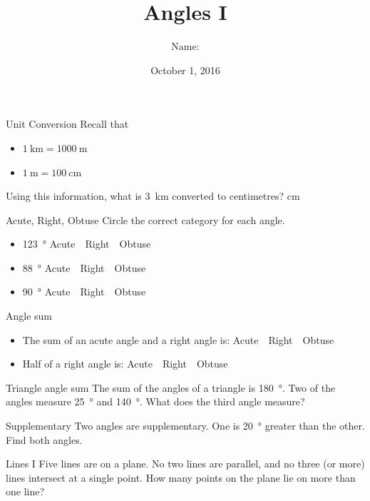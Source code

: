 \documentclass[14pt,letterpaper]{article}
\title{Angles I}
\author{Name: \underline{\hspace{5cm}}}
\date{October 1, 2016}
\begin{document}
\HomeworkTitle

\thispagestyle{empty}

\begin{problem}{Unit Conversion}
  Recall that \begin{itemize}
    \item $\SI{1}{\kilo\metre}=\SI{1000}{\metre}$
    \item $\SI{1}{\metre}=\SI{100}{\centi\metre}$
  \end{itemize}
  Using this information, what is \SI{3}{\kilo\metre} converted to centimetres?
  \hfill \blankE \si{\centi\metre}
\end{problem}

\begin{problem}{Acute, Right, Obtuse}
 Circle the correct category for each angle.

 \begin{itemize}
  \item \SI{123}{\degree} \hfill Acute~~Right~~Obtuse
  \item \SI{88}{\degree} \hfill Acute~~Right~~Obtuse
  \item \SI{90}{\degree} \hfill Acute~~Right~~Obtuse
 \end{itemize}
\end{problem}

\begin{problem}{Angle sum}
 \begin{itemize}
  \item The sum of an acute angle and a right angle is:
        \hfill Acute~~Right~~Obtuse
  \item Half of a right angle is:
        \hfill Acute~~Right~~Obtuse
 \end{itemize}
\end{problem}

\begin{problem}{Triangle angle sum}
 The sum of the angles of a triangle is \SI{180}{\degree}. Two of the angles
 measure \SI{25}{\degree} and \SI{140}{\degree}. What does the third angle
 measure?
\end{problem}

\begin{problem}{Supplementary}
 Two angles are supplementary. One is \SI{20}{\degree} greater than the other.
 Find both angles.
\end{problem}

\begin{problem}{Lines I}
 Five lines are on a plane. No two lines are parallel, and no three (or more)
 lines intersect at a single point. How many points on the plane lie on more
 than one line?
\end{problem}
\end{document}
